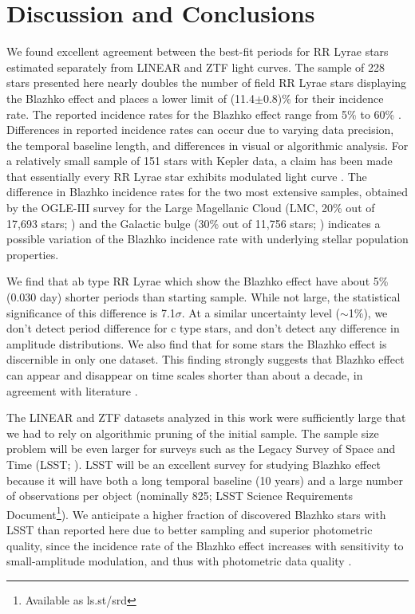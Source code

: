 
\section{Discussion and Conclusions\label{sec:discussion}}

We found excellent agreement
between the best-fit periods for RR Lyrae stars estimated separately from LINEAR and ZTF light curves. 
The sample of 228 stars presented here nearly doubles the number of field RR Lyrae stars displaying the Blazhko
effect and  places a lower limit of (11.4$\pm$0.8)\% for their incidence rate. 
The reported incidence rates for the Blazhko effect
range from 5\% \citep{2007MNRAS.377.1263S} to 60\% \citep{2014A&A...570A.100S}.
Differences in reported incidence rates can occur due to varying data precision, the temporal baseline length, and differences in visual or algorithmic analysis.
For a relatively small sample of
151 stars with Kepler data, a claim has been made that essentially every RR Lyrae star exhibits modulated light curve
\citep{2018A&A...614L...4K}. The difference in Blazhko incidence rates for the two most extensive samples, obtained
by the OGLE-III survey for the Large Magellanic Cloud (LMC, 20\% out of 17,693 stars; \citealt{2009AcA....59....1S})
and the Galactic bulge (30\% out of 11,756 stars; \citealt{2011AcA....61....1S}) indicates a possible variation of
the Blazhko incidence rate with underlying stellar population properties. 
 
We find that ab type RR Lyrae which show the Blazhko effect have about 5\% (0.030 day) shorter periods than starting
sample. While not large, the statistical significance of this difference is 7.1$\sigma$. At a similar uncertainty level
($\sim$1\%), we don't detect period difference for c type stars, and don't detect any difference in amplitude distributions.
We also find that for some stars the Blazhko effect is discernible in only one dataset. This finding  strongly suggests that Blazhko effect can
appear and disappear on time scales shorter than about a decade, in agreement with literature 
\citep{2009MNRAS.400.1006J, 2010A&A...520A.108P, 2014ApJS..213...31B}. 


The LINEAR and ZTF datasets analyzed in this work were sufficiently large that we had to rely on algorithmic
pruning of the initial sample. The sample size problem will be even larger for surveys such as the Legacy Survey
of Space and Time (LSST; \citealt{2019ApJ...873..111I}). LSST will be an excellent survey for studying Blazhko effect
\citep{2022ApJS..258....4H} because it will have both a long temporal baseline (10 years) and a large number of
observations per object (nominally 825; LSST Science Requirements Document\footnote{Available as ls.st/srd}).
We anticipate a higher fraction of discovered Blazhko stars with LSST than reported here due to better sampling
and superior photometric quality, since the incidence rate of the Blazhko effect increases with sensitivity to
small-amplitude modulation, and thus with photometric data quality \citep{2009MNRAS.400.1006J}.

